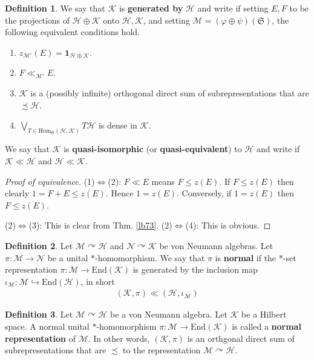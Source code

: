 \documentclass[12pt,b5paper,notitlepage]{article}
\theoremstyle{definition}
\newtheorem{df}{Definition}[section]
\theoremstyle{plain}
\newcommand{\fk}{\mathfrak}
\newcommand{\mc}{\mathcal}
\newcommand{\End}{\mathrm{End}} %
\newcommand{\idt}{\mathbf{1}}
\newcommand{\Hom}{\mathrm{Hom}}
\numberwithin{equation}{section}
\begin{document}
\begin{df}\label{lb100}
We say that $\mc K$ is \textbf{generated by} $\mc H$ and write \pmb{$\mc K\ll \mc H$} \index{KH@$\mc K\ll\mc H$} if setting $E,F$ to be the projections of $\mc H\oplus\mc K$ onto $\mc H,\mc K$, and setting $\mc M=(\varphi\oplus\psi)(\fk S)$, the following equivalent conditions hold.
\begin{enumerate}[label=(\arabic*)]
\item $z_{\mc M'}(E)=\idt_{\mc H\oplus\mc K}$.
\item $F\ll_{\mc M'}E$.
\item $\mc K$ is a (possibly infinite) orthogonal direct sum of subrepresentations that are $\precsim \mc H$.
\item $\bigvee_{T\in\Hom_{\fk S}(\mc H,\mc K)} T\mc H$ is dense in $\mc K$.
\end{enumerate}
We say that $\mc K$ is \textbf{quasi-isomorphic} (or \textbf{quasi-equivalent}) to $\mc H$ and write \pmb{$\mc K\sim\mc H$} if $\mc K\ll\mc H$ and $\mc H\ll\mc K$.
\end{df}

\begin{proof}[Proof of equivalence]
(1)$\Leftrightarrow$(2): $F\ll E$ means $F\leq z(E)$. If $F\leq z(E)$ then clearly $1=F+E\leq z(E)$. Hence $1=z(E)$. Conversely, if $1=z(E)$ then $F\leq z(E)$.

(2)$\Leftrightarrow$(3): This is clear from Thm. \ref{lb73}. (2)$\Leftrightarrow$(4): This is obvious.
\end{proof}




\begin{df}
Let $\mc M\curvearrowright\mc H$ and $\mc N\curvearrowright\mc K$ be von Neumann algebras. Let $\pi:\mc M\rightarrow\mc N$ be a unital $*$-homomorphism. We say that $\pi$ is  \textbf{normal} if the $*$-set representation $\pi:\mc M\rightarrow\End(\mc K)$ is generated by the inclusion map $\iota_{\mc M}:\mc M\hookrightarrow\End(\mc H)$, in short
\begin{align*}
(\mc K,\pi)\ll (\mc H,\iota_{\mc M})
\end{align*}
\end{df}

\begin{df}
Let $\mc M\curvearrowright\mc H$ be a von Neumann algebra. Let $\mc K$ be a Hilbert space. A normal unital $*$-homomorphism $\pi:\mc M\rightarrow\End(\mc K)$ is called a \textbf{normal representation} of $\mc M$. In other words, $(\mc K,\pi)$ is an orthgonal direct sum of subrepresentations that are $\precsim$ to the representation $\mc M\curvearrowright\mc H$.
\end{df}
\end{document}
